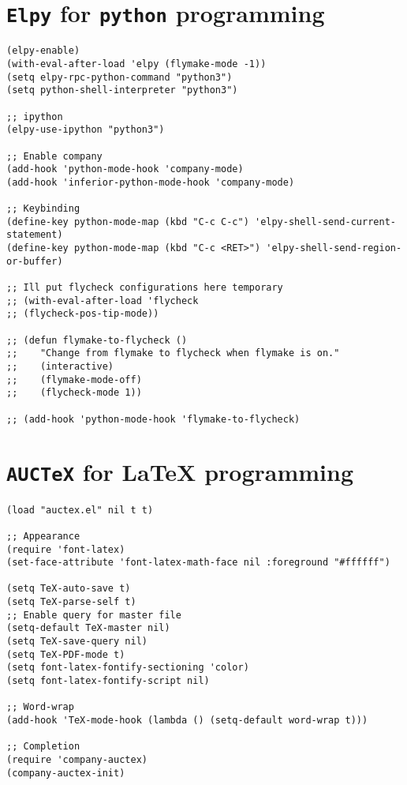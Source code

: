 \documentclass[11pt]{article}
\begin{document}
\section{\texttt{Elpy} for \texttt{python} programming}
\label{sec:org6ada814}

\begin{verbatim}
(elpy-enable)				
(with-eval-after-load 'elpy (flymake-mode -1))
(setq elpy-rpc-python-command "python3")
(setq python-shell-interpreter "python3")

;; ipython
(elpy-use-ipython "python3")

;; Enable company
(add-hook 'python-mode-hook 'company-mode)
(add-hook 'inferior-python-mode-hook 'company-mode)

;; Keybinding
(define-key python-mode-map (kbd "C-c C-c") 'elpy-shell-send-current-statement)
(define-key python-mode-map (kbd "C-c <RET>") 'elpy-shell-send-region-or-buffer)

;; Ill put flycheck configurations here temporary
;; (with-eval-after-load 'flycheck
;; (flycheck-pos-tip-mode))

;; (defun flymake-to-flycheck ()
;;    "Change from flymake to flycheck when flymake is on."
;;    (interactive)
;;    (flymake-mode-off)
;;    (flycheck-mode 1))

;; (add-hook 'python-mode-hook 'flymake-to-flycheck)

\end{verbatim}

\section{\texttt{AUCTeX} for \LaTeX{} programming}
\label{sec:org047d50a}
\begin{verbatim}
(load "auctex.el" nil t t)

;; Appearance
(require 'font-latex)
(set-face-attribute 'font-latex-math-face nil :foreground "#ffffff")

(setq TeX-auto-save t)			    
(setq TeX-parse-self t)
;; Enable query for master file
(setq-default TeX-master nil)		    
(setq TeX-save-query nil)		    
(setq TeX-PDF-mode t)			    
(setq font-latex-fontify-sectioning 'color) 
(setq font-latex-fontify-script nil)	    

;; Word-wrap
(add-hook 'TeX-mode-hook (lambda () (setq-default word-wrap t)))

;; Completion
(require 'company-auctex)
(company-auctex-init)

\end{verbatim}
\end{document}
